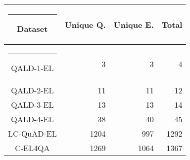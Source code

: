 \begin{table}[h!]
  \centering
  \begin{tabular}{|c|r|r|r|}
    \hline\rule{-2pt}{15pt}
    \textbf{Dataset} & \textbf{Unique Q.} & \textbf{Unique E.} & \textbf{Total} \\
    \hline\rule{-4pt}{10pt}
    QALD-1-EL & 3 & 3 & 4 \\ \hline
    QALD-2-EL & 11 & 11 & 12 \\ \hline
    QALD-3-EL & 13 & 13 & 14 \\ \hline
    QALD-4-EL & 38 & 40 & 45 \\ \hline
    LC-QuAD-EL & 1204 & 997 & 1292 \\ \hline
    C-EL4QA & 1269 & 1064 & 1367 \\ \hline
  \end{tabular}
\end{table}
